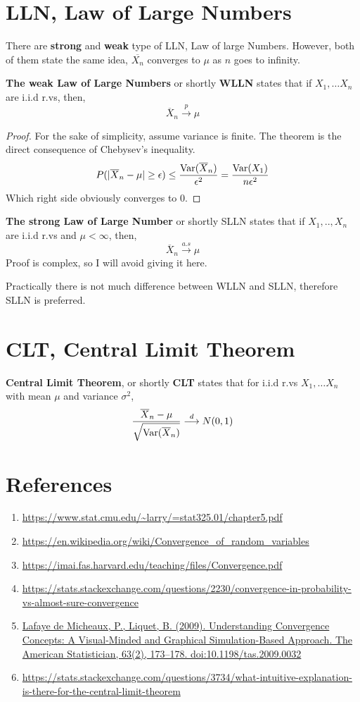 \section{LLN, Law of Large Numbers}
There are \textbf{strong} and \textbf{weak} type of LLN, Law of large Numbers. However, both of them state the same idea, $\overline{X_n}$ converges to $\mu$ as  $n$ goes to infinity.
\begin{theorem}
    \textbf{The weak Law of Large Numbers} or shortly \textbf{WLLN} states that if $X_1, \ldots X_n$ are i.i.d r.vs, then,
    \[ \overline{X}_n \stackrel{p}{\longrightarrow} \mu\]
    \begin{proof}
        For the sake of simplicity, assume variance is finite.
        The theorem is the direct consequence of  Chebysev's inequality.
        \[ P( |\overline{X}_n - \mu| \ge \epsilon) \le \frac{{\operatorname{Var}}(\overline{X}_n)}{\epsilon^2} = \frac{{\operatorname{Var}}(X_1)}{n\epsilon^2}\]
    Which right side obviously converges to $0$.
    \end{proof}
\end{theorem}
\begin{theorem}
    \textbf{The strong Law of Large Number} or shortly SLLN states that if $X_1,..,X_n$ are i.i.d r.vs and $\mu < \infty$, then,
    \[ \overline{X}_n \stackrel{a.s}{\longrightarrow} \mu \]
    Proof is complex, so I will avoid giving it here.
\end{theorem}
Practically there is not much difference between WLLN and SLLN, therefore SLLN is preferred.
\section{CLT, Central Limit Theorem}
\begin{theorem}
    \textbf{Central Limit Theorem}, or shortly \textbf{CLT} states that for i.i.d r.vs $X_1, \ldots X_n$ with mean $\mu$ and variance $\sigma^2$,
    \[ \frac{\overline{X}_n - \mu}{\sqrt{{\operatorname{Var}} ( \overline{X}_n)}} \stackrel{d}{\longrightarrow} N(0,1)\]
\end{theorem}

\section{References}
\begin{enumerate}
    \item \url{https://www.stat.cmu.edu/~larry/=stat325.01/chapter5.pdf} 
    \item \url{https://en.wikipedia.org/wiki/Convergence_of_random_variables}
    \item \url{https://imai.fas.harvard.edu/teaching/files/Convergence.pdf}
    \item \url{https://stats.stackexchange.com/questions/2230/convergence-in-probability-vs-almost-sure-convergence}
    \item \url{Lafaye de Micheaux, P.,  Liquet, B. (2009). Understanding Convergence Concepts: A Visual-Minded and Graphical Simulation-Based Approach. The American Statistician, 63(2), 173–178. doi:10.1198/tas.2009.0032}
    \item \url{https://stats.stackexchange.com/questions/3734/what-intuitive-explanation-is-there-for-the-central-limit-theorem}
\end{enumerate}

